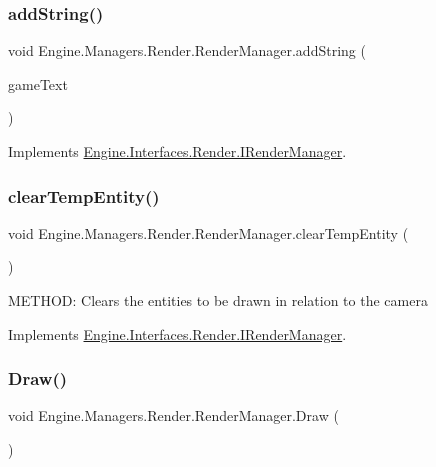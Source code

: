 \subsubsection{\texorpdfstring{add\+String()}{addString()}}
{\footnotesize\ttfamily void Engine.\+Managers.\+Render.\+Render\+Manager.\+add\+String (\begin{DoxyParamCaption}\item[{\hyperlink{a00598}{Game\+Text}}]{game\+Text }\end{DoxyParamCaption})\hspace{0.3cm}{\ttfamily [inline]}}



Implements \hyperlink{a00458_ae3d8ed9fc1406b62e04ac8336e4e40b3}{Engine.\+Interfaces.\+Render.\+I\+Render\+Manager}.

\mbox{\label{a00526_af77caeb94739b508306100cdedfcbd9b}} 
\subsubsection{\texorpdfstring{clear\+Temp\+Entity()}{clearTempEntity()}}
{\footnotesize\ttfamily void Engine.\+Managers.\+Render.\+Render\+Manager.\+clear\+Temp\+Entity (\begin{DoxyParamCaption}{ }\end{DoxyParamCaption})\hspace{0.3cm}{\ttfamily [inline]}}



M\+E\+T\+H\+OD\+: Clears the entities to be drawn in relation to the camera 



Implements \hyperlink{a00458_a7879b28e310859cdebdc2c8aeaced6b3}{Engine.\+Interfaces.\+Render.\+I\+Render\+Manager}.

\mbox{\label{a00526_ae9fd08da224435b71540e67f718eb7c4}} 
\subsubsection{\texorpdfstring{Draw()}{Draw()}\hspace{0.1cm}{\footnotesize\ttfamily [1/2]}}
{\footnotesize\ttfamily void Engine.\+Managers.\+Render.\+Render\+Manager.\+Draw (\begin{DoxyParamCaption}{ }\end{DoxyParamCaption})\hspace{0.3cm}{\ttfamily [inline]}}



